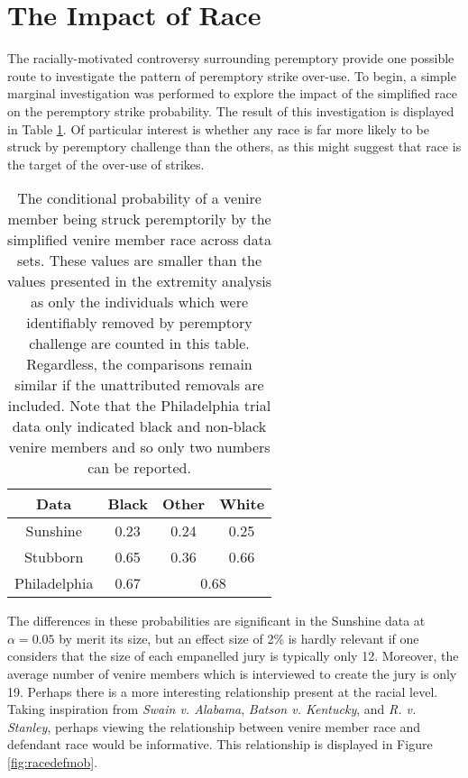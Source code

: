 \section{The Impact of Race} \label{sec:impactrace}

The racially-motivated controversy surrounding peremptory provide one possible route to investigate the pattern of peremptory
strike over-use. To begin, a simple marginal investigation was performed to explore the impact of the simplified race on the
peremptory strike probability. The result of this investigation is displayed in Table \ref{tab:margrace}. Of particular interest
is whether any race is far more likely to be struck by peremptory challenge than the others, as this might suggest that race is
the target of the over-use of strikes.

\begin{table}
  \centering
  \caption[Strike Rate by Race]{The conditional probability of a venire member being struck peremptorily by the simplified venire
    member race across data sets. These values are smaller than the values presented in the extremity analysis as only the
    individuals which were identifiably removed by peremptory challenge are counted in this table. Regardless, the comparisons 
    remain similar if the unattributed removals are included. Note that the Philadelphia trial data only indicated black and
    non-black venire members and so only two numbers can be reported.} \label{tab:margrace}
  \begin{tabular}{|c|c c c|} \hline
    Data & Black & Other & White \\ \hline
    Sunshine & 0.23 & 0.24 & 0.25 \\ 
    Stubborn & 0.65 & 0.36 & 0.66 \\ 
    Philadelphia & 0.67 & \multicolumn{2}{c|}{0.68} \\ \hline
  \end{tabular}
\end{table}

The differences in these probabilities are significant in the Sunshine data at $\alpha = 0.05$ by merit its size, but an effect
size of 2\% is hardly relevant if one considers that the size of each empanelled jury is typically only 12. Moreover, the average
number of venire members which is interviewed to create the jury is only 19. Perhaps there is a more interesting relationship
present at the racial level. Taking inspiration from \textit{Swain v. Alabama}, \textit{Batson v. Kentucky}, and
\textit{R. v. Stanley}, perhaps viewing the relationship between venire member race and defendant race would be informative. This
relationship is displayed in Figure \ref{fig:racedefmob}.

